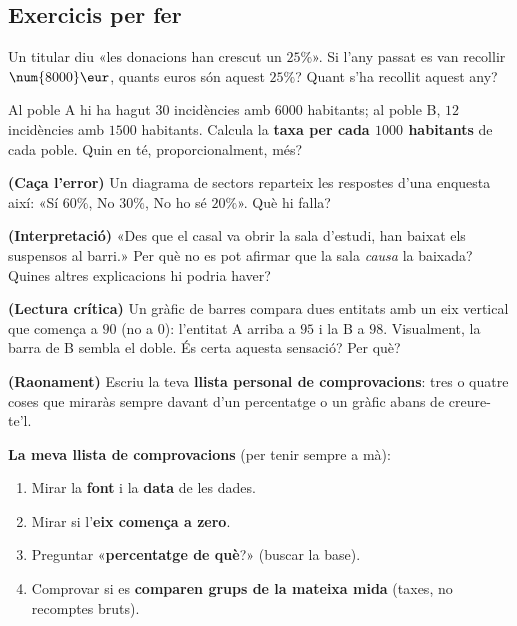 \subsection{Exercicis per fer}

\begin{exercicis}
\begin{exlist}
  \item Un titular diu «les donacions han crescut un $25\%$». Si l'any passat es van
        recollir $\num{8000}\eur$, quants euros són aquest $25\%$? Quant s'ha recollit
        aquest any?
  \item Al poble A hi ha hagut $30$ incidències amb $\num{6000}$ habitants; al poble B,
        $12$ incidències amb $\num{1500}$ habitants. Calcula la \textbf{taxa per cada
        $\num{1000}$ habitants} de cada poble. Quin en té, proporcionalment, més?
  \item \textbf{(Caça l'error)} Un diagrama de sectors reparteix les respostes d'una
        enquesta així: «Sí $60\%$, No $30\%$, No ho sé $20\%$». Què hi falla?
  \item \textbf{(Interpretació)} «Des que el casal va obrir la sala d'estudi, han
        baixat els suspensos al barri.» Per què no es pot afirmar que la sala
        \emph{causa} la baixada? Quines altres explicacions hi podria haver?
  \item \textbf{(Lectura crítica)} Un gràfic de barres compara dues entitats amb un
        eix vertical que comença a $90$ (no a $0$): l'entitat A arriba a $95$ i la B a
        $98$. Visualment, la barra de B sembla el doble. És certa aquesta sensació?
        Per què?
  \item \textbf{(Raonament)} Escriu la teva \textbf{llista personal de comprovacions}:
        tres o quatre coses que miraràs sempre davant d'un percentatge o un gràfic
        abans de creure-te'l.
\end{exlist}
\end{exercicis}

\begin{idea}
\textbf{La meva llista de comprovacions} (per tenir sempre a mà):
\begin{enumerate}[leftmargin=1.6em, itemsep=1pt]
  \item Mirar la \textbf{font} i la \textbf{data} de les dades.
  \item Mirar si l'\textbf{eix comença a zero}.
  \item Preguntar «\textbf{percentatge de què}?» (buscar la base).
  \item Comprovar si es \textbf{comparen grups de la mateixa mida} (taxes, no
        recomptes bruts).
\end{enumerate}
\end{idea}

